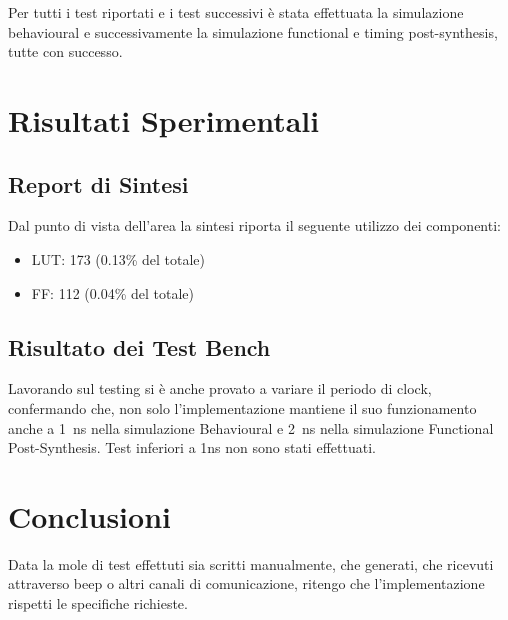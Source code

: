 \documentclass{article}
\begin{document}
Per tutti i test riportati e i test successivi è stata effettuata la simulazione behavioural e successivamente la simulazione functional e timing post-synthesis, tutte con successo.\\

\section{Risultati Sperimentali}
\label{risultati}

\subsection{Report di Sintesi}

Dal punto di vista dell'area la sintesi riporta il seguente utilizzo dei componenti:
\begin{itemize}
\item LUT: 173 (0.13\% del totale)
\item FF: 112 (0.04\% del totale)
\end{itemize}

\subsection{Risultato dei Test Bench}

Lavorando sul testing si è anche provato a variare il periodo di clock, confermando che, non solo l'implementazione mantiene il suo funzionamento anche a \SI{1}{\ns} nella simulazione Behavioural e \SI{2}{\ns} nella simulazione Functional Post-Synthesis. Test inferiori a 1ns non sono stati effettuati.\\

\section{Conclusioni}

Data la mole di test effettuti sia scritti manualmente, che generati, che ricevuti attraverso beep o altri canali di comunicazione, ritengo che l'implementazione rispetti le specifiche richieste.
\end{document}
